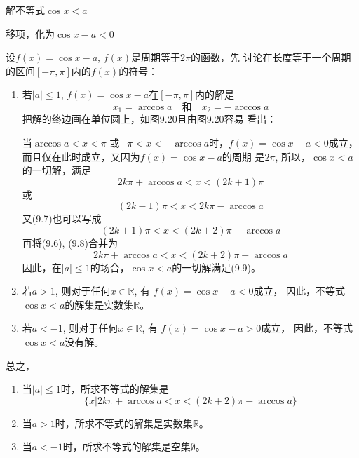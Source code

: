 \begin{example}
    解不等式$\cos x<a$
\end{example}

\begin{solution}
移项，化为$\cos x-a<0$

设$f(x)=\cos x-a$, $f(x)$是周期等于$2\pi$的函数，先
讨论在长度等于一个周期的区间$[-\pi,\pi]$内的$f(x)$的符号：
\begin{enumerate}
    \item 若$|a|\le 1$, $f(x)=\cos x-a$在$[-\pi,\pi]$内的解是
\[x_1=\arccos a\quad \text{和}\quad x_2=-\arccos a\]
把解的终边画在单位圆上，如图9.20且由图9.20容易
看出：
\begin{figure}[htp]
    \centering
{}
    \caption{}
\end{figure}

当$\arccos a<x<\pi$ 或$-\pi <x<-\arccos a$时，$f(x)=\cos x-
a<0$成立，而且仅在此时成立，又因为$f(x)=\cos x-a$的周期
是$2\pi$, 所以，$\cos x<a$的一切解，满足
\begin{equation}
   2k\pi +\arccos a<x<(2k+1)\pi  
\end{equation}
或
\begin{equation}
    (2k-1)\pi <x<2k\pi -\arccos a
\end{equation}
又(9.7)也可以写成
\begin{equation}
    (2k+1)\pi <x<(2k+2)\pi -\arccos a
\end{equation}
再将(9.6), (9.8)合并为
\begin{equation}
    2k\pi +\arccos a<x<(2k+2)\pi -\arccos a
\end{equation} 
因此，在$|a|\le 1$的场合，$\cos x<a$的一切解满足(9.9)。

\item 若$a>1$, 则对于任何$x\in\mathbb{R}$, 有
$f(x)=\cos x-a<0$成立，
因此，不等式$\cos x<a$的解集是实数集$\mathbb{R}$。
\item 若$a<-1$, 则对于任何$x\in\mathbb{R}$, 有
$f(x)=\cos x-a>0$成立，
因此，不等式$\cos x<a$没有解。
\end{enumerate}

总之，
\begin{enumerate}
\item 当$|a|\le 1$时，所求不等式的解集是
\[\{x|2k\pi  +\arccos a<x<(2k+2)\pi -\arccos a\}\]
\item 当$a>1$时，所求不等式的解集是实数集$\mathbb{R}$。
\item 当$a<-1$时，所求不等式的解集是空集$\emptyset$。
\end{enumerate}
\end{solution}


